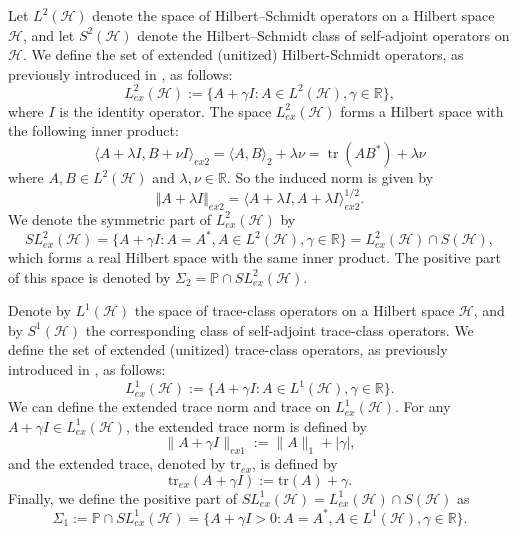 \documentclass[12pt,reqno]{amsart}
\DeclareMathOperator{\tr}{\mathrm{tr}}
\begin{document}
Let $L^2(\mathcal{H})$ denote the space of Hilbert--Schmidt operators on a Hilbert space $\mathcal{H}$, and let $S^2(\mathcal{H})$ denote the Hilbert--Schmidt class of self-adjoint operators on $\mathcal{H}$.
 We define the set of extended (unitized) Hilbert-Schmidt operators, as previously introduced in \cite{L, LL}, as follows:
\begin{displaymath}
L^{2}_{ex} (\mathcal{H}) := \{ A + \gamma I: A \in L^{2} (\mathcal{H}), \gamma \in \mathbb{R} \},
\end{displaymath}
where $I$ is the identity operator. The space $L^2_{ex}(\mathcal{H})$ forms a Hilbert space with the following inner product:
\begin{displaymath}
\langle A + \lambda I, B +\nu I \rangle_{ex2} = \langle A, B \rangle_2 + \lambda \nu = \tr(AB^*) + \lambda \nu
\end{displaymath}
where $A, B \in L^2(\mathcal{H})$ and $\lambda, \nu \in \mathbb{R}$. So the induced norm is given by
\begin{displaymath}
\Vert A + \lambda I \Vert_{ex2} = \langle A + \lambda I, A + \lambda I \rangle_{ex2}^{1/2}.
\end{displaymath}
We denote the symmetric part of $L^2_{ex}(\mathcal{H})$ by
\begin{displaymath}
SL^{2}_{ex} (\mathcal{H}) = \{ A + \gamma I:  A = A^{*}, A \in L^{2} (\mathcal{H}), \gamma \in \mathbb{R} \} = L^{2}_{ex} (\mathcal{H}) \cap S(\mathcal{H}),
\end{displaymath}
which forms a real Hilbert space with the same inner product. The positive part of this space is denoted by $\Sigma_{2} = \mathbb{P} \cap SL^{2}_{ex} (\mathcal{H})$.



Denote by $L^1(\mathcal{H})$ the space of trace-class operators on a Hilbert space $\mathcal{H}$, and by $S^1(\mathcal{H})$ the corresponding class of self-adjoint trace-class operators. We define the set of extended (unitized) trace-class operators, as previously introduced in \cite{M}, as follows:
\begin{displaymath}
L^{1}_{ex} (\mathcal{H}) := \{ A + \gamma I: A \in L^{1} (\mathcal{H}), \gamma \in \mathbb{R} \}.
\end{displaymath}
We can define the extended trace norm and trace on $L^1_{ex}(\mathcal{H})$. For any $A + \gamma I \in L^1_{ex}(\mathcal{H})$, the extended trace norm is defined by
\begin{displaymath}
\| A + \gamma I \|_{ex1} :=  \| A \|_1 + | \gamma |,
\end{displaymath}
and the extended trace, denoted by $\mathrm{tr}_{ex}$, is defined by
\begin{displaymath}
\text{tr}_{ex}(A + \gamma I) := \text{tr}(A) + \gamma.
\end{displaymath}
Finally, we define the positive part of $SL^1_{ex}(\mathcal{H}) = L^1_{ex}(\mathcal{H}) \cap S(\mathcal{H})$ as
\begin{displaymath}
\Sigma_1 := \mathbb{P} \cap SL^{1}_{ex} (\mathcal{H}) = \{ A + \gamma I > 0 :  A = A^{*}, A \in L^{1} (\mathcal{H}), \gamma \in \mathbb{R} \}.
\end{displaymath}
\end{document}
